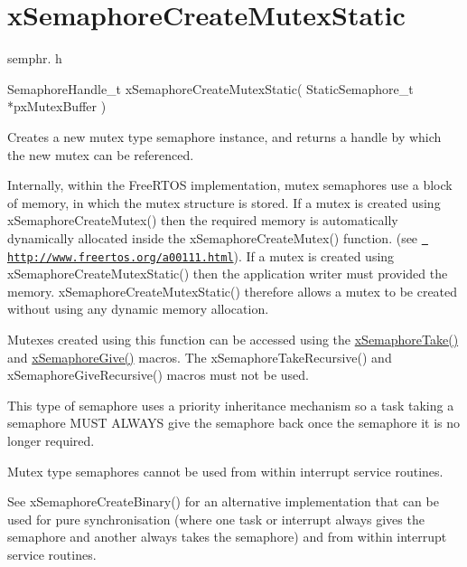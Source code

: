 \hypertarget{group__x_semaphore_create_mutex_static}{}\section{x\+Semaphore\+Create\+Mutex\+Static}
\label{group__x_semaphore_create_mutex_static}
semphr. h 
\begin{DoxyPre}SemaphoreHandle\_t xSemaphoreCreateMutexStatic( StaticSemaphore\_t *pxMutexBuffer )\end{DoxyPre}


Creates a new mutex type semaphore instance, and returns a handle by which the new mutex can be referenced.

Internally, within the Free\+R\+T\+OS implementation, mutex semaphores use a block of memory, in which the mutex structure is stored. If a mutex is created using x\+Semaphore\+Create\+Mutex() then the required memory is automatically dynamically allocated inside the x\+Semaphore\+Create\+Mutex() function. (see \href{http://www.freertos.org/a00111.html}{\texttt{ http\+://www.\+freertos.\+org/a00111.\+html}}). If a mutex is created using x\+Semaphore\+Create\+Mutex\+Static() then the application writer must provided the memory. x\+Semaphore\+Create\+Mutex\+Static() therefore allows a mutex to be created without using any dynamic memory allocation.

Mutexes created using this function can be accessed using the \mbox{\hyperlink{semphr_8h_af116e436d2a5ae5bd72dbade2b5ea930}{x\+Semaphore\+Take()}} and \mbox{\hyperlink{semphr_8h_aae55761cabfa9bf85c8f4430f78c0953}{x\+Semaphore\+Give()}} macros. The x\+Semaphore\+Take\+Recursive() and x\+Semaphore\+Give\+Recursive() macros must not be used.

This type of semaphore uses a priority inheritance mechanism so a task \textquotesingle{}taking\textquotesingle{} a semaphore M\+U\+ST A\+L\+W\+A\+YS \textquotesingle{}give\textquotesingle{} the semaphore back once the semaphore it is no longer required.

Mutex type semaphores cannot be used from within interrupt service routines.

See x\+Semaphore\+Create\+Binary() for an alternative implementation that can be used for pure synchronisation (where one task or interrupt always \textquotesingle{}gives\textquotesingle{} the semaphore and another always \textquotesingle{}takes\textquotesingle{} the semaphore) and from within interrupt service routines.


